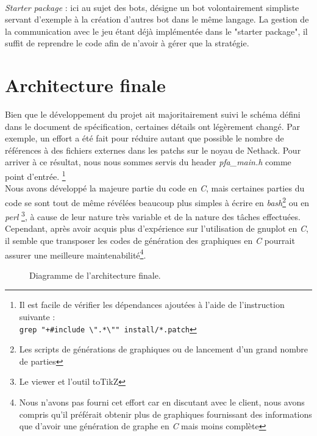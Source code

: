 \documentclass[a4paper,12pt]{article}
\begin{document}
\paragraph{}
\emph{Starter package} : ici au sujet des bots, désigne un bot volontairement
simpliste servant d'exemple à la création d'autres bot dans le même langage.
La gestion de la communication avec le jeu étant déjà implémentée dans le
"starter package", il suffit de reprendre le code afin de n'avoir à gérer que
la stratégie.

\section{Architecture finale}

Bien que le développement du projet ait majoritairement suivi le schéma
défini dans le document de spécification, certaines détails ont légèrement
changé. Par exemple, un effort a été fait pour réduire autant que possible
le nombre de références à des fichiers externes dans les patchs sur le noyau
de Nethack. Pour arriver à ce résultat, nous nous sommes servis du header
{\em pfa\_main.h} comme point d'entrée.
\footnote{Il est facile de vérifier les dépendances ajoutées à l'aide de
  l'instruction suivante :\\
{\verb*|grep "+#include \".*\"" install/*.patch|}}
\\
Nous avons développé la majeure partie du code en {\em C}, mais certaines
parties du code se sont tout de même révélées beaucoup plus simples à
écrire en {\em bash}\footnote{Les scripts de générations de graphiques ou de
  lancement d'un grand nombre de parties} ou en {\em perl}
\footnote{Le viewer et l'outil toTikZ}, à cause de leur nature très variable
et de la nature des tâches effectuées. Cependant, après avoir acquis plus
d'expérience sur l'utilisation de gnuplot en {\em C}, il semble que transposer
les codes de génération des graphiques en {\em C} pourrait assurer une
meilleure maintenabilité\footnote{Nous n'avons pas fourni cet effort car en
discutant avec le client, nous avons compris qu'il préférait obtenir plus de
graphiques fournissant des informations que d'avoir une génération de graphe
en {\em C} mais moins complète}.

\begin{figure}[H]
	\caption{\label{fig:architecture} Diagramme de l'architecture finale.}
\end{figure}
\end{document}
